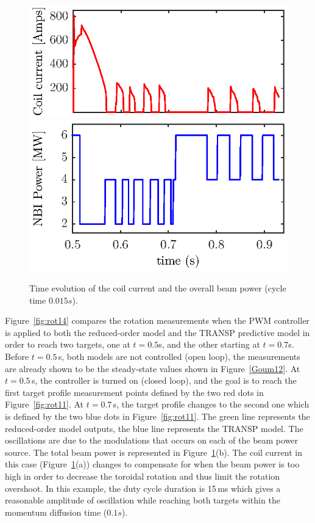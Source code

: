 \documentclass[12pt,lot, lof]{puthesis}
\begin{document}
\begin{figure}
	\centering
	\includegraphics[width=0.8 \linewidth]{fig17a}  \\[-0.5em]
	\includegraphics[width=0.8 \linewidth]{fig17b} 
	\caption{Time evolution of the coil current and the overall beam power (cycle time $0.015  s$).}
	\label{fig:rot15}
\end{figure}

Figure~\ref{fig:rot14} compares the rotation measurements when the PWM controller is applied to both the reduced-order model and the TRANSP predictive model in order to reach two targets, one at $t = 0.5$s, and the other starting at $t=0.7$s.
Before $t=0.5$\,s, both models are not controlled (open loop), the measurements are already shown to be the steady-state values shown in Figure~\ref{Goum12}.
At $t = 0.5$\,s, the controller is turned on (closed loop), and the goal is to reach the first target profile measurement points defined by the two red dots in Figure~\ref{fig:rot11}. At $t = 0.7$\,s, the  target profile changes to the second one which is defined by the two blue dots in Figure~\ref{fig:rot11}.
The green line represents the reduced-order model outputs, the blue line represents the TRANSP model. The oscillations are due to the modulations that occurs on each of the beam power source. The total beam power is represented in Figure~\ref{fig:rot15}(b). The coil current in this case (Figure~\ref{fig:rot15}(a)) changes to compensate for when the beam power is too high in order to decrease the toroidal rotation and thus limit the rotation overshoot.
In this example, the duty cycle duration is 15\,ms which gives a reasonable amplitude of oscillation while reaching both targets within the momentum diffusion time ($0.1 s$).
\end{document}
